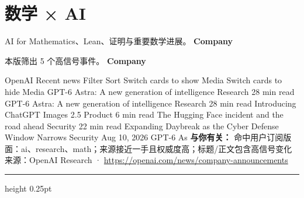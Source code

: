 \documentclass[10.5pt]{ctexart}
\begin{document}
\section*{数学 × AI}
{\color{ormuted} AI for Mathematics、Lean、证明与重要数学进展。}
\vspace{2mm}
{\LARGE\bfseries Company}\par
\vspace{1mm}
{\color{ormuted} 本版筛出 5 个高信号事件。}
\vspace{3mm}
{\Large\bfseries Company}\par
OpenAI Recent news Filter Sort Switch cards to show Media Switch cards to hide Media GPT-6 Astra: A new generation of intelligence Research 28 min read GPT-6 Astra: A new generation of intelligence Research 28 min read Introducing ChatGPT Images 2.5 Product 6 min read The Hugging Face incident and the road ahead Security 22 min read Expanding Daybreak as the Cyber Defense Window Narrows Security Aug 10, 2026 GPT-6 As
\textbf{与你有关：} 命中用户订阅版面：ai、research、math；来源接近一手且权威度高；标题/正文包含高信号变化
{\footnotesize\color{ormuted} 来源：OpenAI Research · \url{https://openai.com/news/company-announcements}}
\vspace{4mm}
\hrule height 0.25pt
\vspace{3mm}
\end{document}
